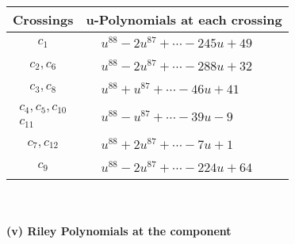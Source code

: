 \documentclass[1p]{elsarticle_modified}
\theoremstyle{definition}
\begin{document}
\begin{tabular}{m{50pt}|m{274pt}}
Crossings & \hspace{64pt}u-Polynomials at each crossing \\
\hline $$\begin{aligned}c_{1}\end{aligned}$$&$\begin{aligned}
&u^{88}-2 u^{87}+\cdots-245 u+49
\end{aligned}$\\
\hline $$\begin{aligned}c_{2},c_{6}\end{aligned}$$&$\begin{aligned}
&u^{88}-2 u^{87}+\cdots-288 u+32
\end{aligned}$\\
\hline $$\begin{aligned}c_{3},c_{8}\end{aligned}$$&$\begin{aligned}
&u^{88}+u^{87}+\cdots-46 u+41
\end{aligned}$\\
\hline $$\begin{aligned}c_{4},c_{5},c_{10}\\c_{11}\end{aligned}$$&$\begin{aligned}
&u^{88}- u^{87}+\cdots-39 u-9
\end{aligned}$\\
\hline $$\begin{aligned}c_{7},c_{12}\end{aligned}$$&$\begin{aligned}
&u^{88}+2 u^{87}+\cdots-7 u+1
\end{aligned}$\\
\hline $$\begin{aligned}c_{9}\end{aligned}$$&$\begin{aligned}
&u^{88}-2 u^{87}+\cdots-224 u+64
\end{aligned}$\\
\hline
\end{tabular}\\~\\
\newpage\renewcommand{\arraystretch}{1}
\flushleft \textbf{(v) Riley Polynomials at the component}\newline \\
\end{document}
